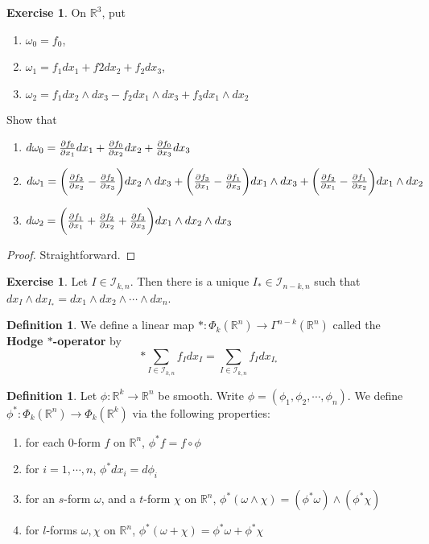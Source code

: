 \documentclass[12pt]{amsart}
\theoremstyle{definition}
\newtheorem{defn}[definition]{Definition}
\theoremstyle{remark}
\theoremstyle{definition}
\newtheorem{ex}[definition]{Exercise}
\newcommand{\om}{\omega}
\newcommand{\R}{\mathbb{R}}
\newcommand{\MI}{\mathcal{I}}
\begin{document}
	\begin{ex}
		On $\R^3$, put 
		\begin{enumerate}
			\item $\om_0 = f_0$, 
			\item $\om_1 = f_1 dx_1 + f2 dx_2 + f_2 dx_3$, 
			\item $\om_2 = f_1dx_2\wedge dx_3 - f_2 dx_1 \wedge dx_3 + f_3 dx_1 \wedge dx_2$
		\end{enumerate} 
		Show that
		\begin{enumerate}
			\item $d\om_0 = \pdv{f_0}{x_1}dx_1 + \pdv{f_0}{x_2}dx_2 + \pdv{f_0}{x_3}dx_3$
			\item $d \om_1 = \bigg(\pdv{f_3}{x_2} - \pdv{f_2}{x_3} \bigg) dx_2 \wedge dx_3 + \bigg( \pdv{f_3}{x_1} - \pdv{f_1}{x_3}\bigg)dx_1 \wedge dx_3 + \bigg( \pdv{f_2}{x_1} - \pdv{f_1}{x_2} \bigg) dx_1 \wedge dx_2$
			\item $d \om_2 = \bigg( \pdv{f_1}{x_1} + \pdv{f_2}{x_2} + \pdv{f_3}{x_3} \bigg) dx_1 \wedge dx_2 \wedge dx_3$ 
		\end{enumerate}
	\end{ex}

	\begin{proof}
		Straightforward.
	\end{proof}

	\begin{ex}
		Let $I \in \MI_{k, n}$. Then there is a unique $I_* \in \MI_{n-k, n}$ such that $dx_I \wedge dx_{I_*} = dx_1 \wedge dx_2 \wedge \cdots \wedge dx_n$.
	\end{ex}
	
	\begin{defn}
		We define a linear map $*:\Phi_k(\R^n) \rightarrow \Gamma^{n-k}(\R^n)$ called the \textbf{Hodge $*$-operator} by $$* \sum\limits_{I \in \MI_{k,n}} f_I dx_I = \sum\limits_{I \in \MI_{k,n}} f_Idx_{I_*}$$
	\end{defn}

	\begin{defn}
		Let $\phi: \R^k \rightarrow \R^n$ be smooth. Write $\phi = (\phi_1, \phi_2, \cdots, \phi_n)$. We define $\phi^*:\Phi_k(\R^n) \rightarrow \Phi_k(\R^k)$ via the following properties: 
		\begin{enumerate}
			\item for each $0$-form $f$ on $\R^n$, $\phi^*f = f \circ \phi$
			\item  for $i = 1, \cdots , n$, $\phi^* dx_i = d\phi_i$ 
			\item for an $s$-form $\om$, and a $t$-form $\chi$ on $\R^n$,  $\phi^* (\om \wedge \chi) = (\phi^*\om) \wedge (\phi^*\chi)$
			\item for $l$-forms $\om, \chi$ on $\R^n$, $\phi^*(\om + \chi) = \phi^*\om + \phi^*\chi$ 
		\end{enumerate}
	\end{defn}
\end{document}

